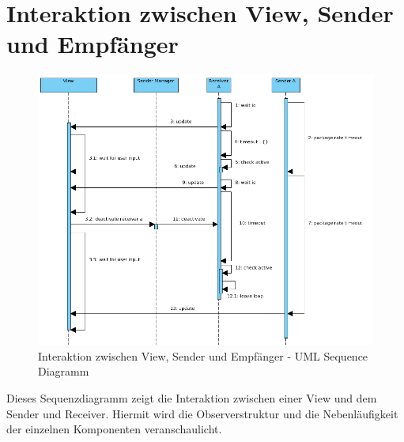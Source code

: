 \section{Interaktion zwischen View, Sender und Empfänger}
\label{sec:5:readconf}
\begin{figure}[H]
\includegraphics[width=15cm]{images/Threads.png}
\centering
\caption{Interaktion zwischen View, Sender und Empfänger - UML Sequence Diagramm}
\label{fig_threads}
\end{figure}

Dieses Sequenzdiagramm zeigt die Interaktion zwischen einer View und
dem Sender und Receiver. Hiermit wird die Observerstruktur und die
Nebenläufigkeit der einzelnen Komponenten veranschaulicht.
